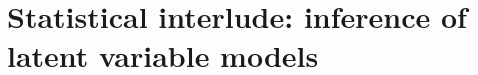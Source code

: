 \documentclass[8pt]{beamer}
\begin{document}
\section[Inference of latent variable models]{Statistical interlude: inference of latent variable models}
% 
\end{document}
